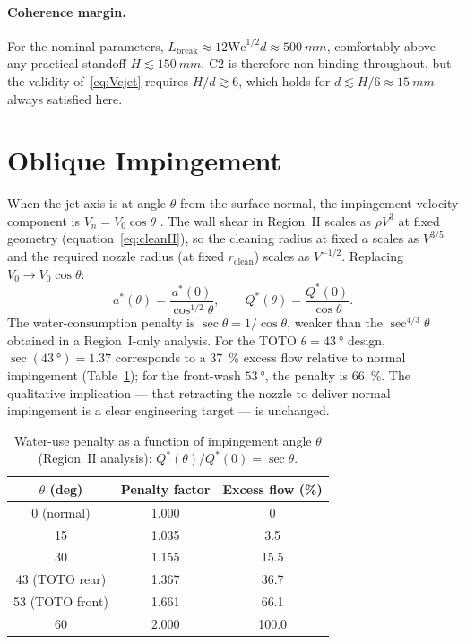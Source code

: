 \documentclass[aps,prfluids,reprint,amsmath,amssymb,floatfix]{revtex4-2}
\newcommand{\We}{\mathrm{We}}
\begin{document}
\paragraph{Coherence margin.}
For the nominal parameters, $L_\mathrm{break} \approx 12\We^{1/2}d \approx
\SI{500}{mm}$, comfortably above any practical standoff $H \lesssim
\SI{150}{mm}$. C2 is therefore non-binding throughout, but the validity
of~\eqref{eq:Vcjet} requires $H/d \gtrsim 6$, which holds for
$d \lesssim H/6 \approx \SI{15}{mm}$ --- always satisfied here.

\section{Oblique Impingement}
\label{sec:oblique}

When the jet axis is at angle $\theta$ from the surface normal, the
impingement velocity component is $V_n = V_0 \cos\theta$
\citep{BeitelmalEtAl2000}. The wall
shear in Region~II scales as $\rho V^3$ at fixed geometry
(equation~\eqref{eq:cleanII}), so the cleaning radius at fixed $a$
scales as $V^{3/5}$ and the required nozzle radius (at fixed
$r_\mathrm{clean}$) scales as $V^{-1/2}$. Replacing $V_0 \to V_0\cos\theta$:
\begin{equation}
  a^*(\theta) = \frac{a^*(0)}{\cos^{1/2}\theta},
  \qquad
  Q^*(\theta) = \frac{Q^*(0)}{\cos\theta}.
  \label{eq:obliqueII}
\end{equation}
The water-consumption penalty is $\sec\theta = 1/\cos\theta$, weaker than
the $\sec^{4/3}\theta$ obtained in a Region~I-only analysis. For the
TOTO $\theta = \SI{43}{\degree}$ design,
$\sec(\SI{43}{\degree}) = 1.37$ corresponds to a \SI{37}{\percent}
excess flow relative to normal impingement (Table~\ref{tab:oblique});
for the front-wash $\SI{53}{\degree}$, the penalty is \SI{66}{\percent}. The qualitative
implication --- that retracting the nozzle to deliver normal
impingement is a clear engineering target --- is unchanged.

\begin{table}[h]
\centering
\caption{Water-use penalty as a function of impingement angle $\theta$
(Region~II analysis): $Q^*(\theta)/Q^*(0) = \sec\theta$.}
\label{tab:oblique}
\begin{tabular}{ccc}
\toprule
$\theta$ (deg) & Penalty factor & Excess flow (\%) \\
\midrule
0 (normal)  & 1.000 & 0 \\
15          & 1.035 & 3.5 \\
30          & 1.155 & 15.5 \\
43 (TOTO rear)  & 1.367 & 36.7 \\
53 (TOTO front) & 1.661 & 66.1 \\
60          & 2.000 & 100.0 \\
\bottomrule
\end{tabular}
\end{table}
\end{document}
